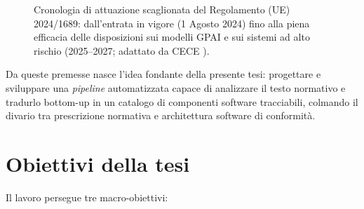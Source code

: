 \documentclass[12pt,a4paper,oneside]{report}
\begin{document}
\begin{figure}[htbp]
{
}
\caption[Cronologia di attuazione ed efficacia temporale dell'AI Act]{Cronologia di attuazione scaglionata del Regolamento (UE) 2024/1689: dall'entrata in vigore (1 Agosto 2024) fino alla piena efficacia delle disposizioni sui modelli GPAI e sui sistemi ad alto rischio (2025--2027; adattato da CECE \cite{cece2024aiact}).}
\label{fig:timeline_aiact}
\end{figure}

\newpage
Da queste premesse nasce l'idea fondante della presente tesi: progettare e sviluppare una \textit{pipeline} automatizzata capace di analizzare il testo normativo e tradurlo bottom-up in un catalogo di componenti software tracciabili, colmando il divario tra prescrizione normativa e architettura software di conformità.




\section{Obiettivi della tesi}
\label{sec:obiettivi}
Il lavoro persegue tre macro-obiettivi:
\end{document}
